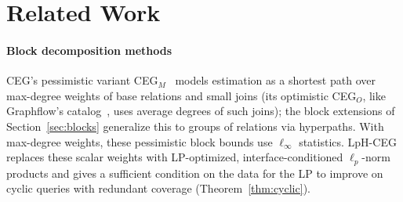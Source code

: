 \documentclass[conference]{IEEEtran}
\begin{document}
\section{Related Work}
\label{sec:related}

\paragraph{Block decomposition methods}
CEG's pessimistic variant CEG$_M$~\cite{chen2022ceg,salihoglu2026ceg} models estimation as a shortest path over max-degree weights of base relations and small joins (its optimistic CEG$_O$, like Graphflow's catalog~\cite{mhedhbi2019graphflow}, uses average degrees of such joins); the block extensions of Section~\ref{sec:blocks} generalize this to groups of relations via hyperpaths. With max-degree weights, these pessimistic block bounds use $\ell_\infty$ statistics. LpH-CEG replaces these scalar weights with LP-optimized, interface-conditioned $\ell_p$-norm products and
gives a sufficient condition on the data for the LP to improve on cyclic queries with
redundant coverage (Theorem~\ref{thm:cyclic}).
\end{document}
